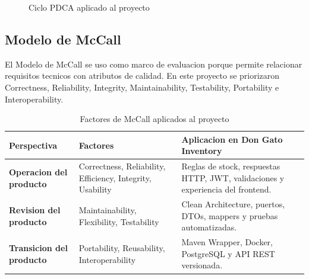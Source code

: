 \documentclass[11pt,oneside]{article}
\begin{document}
\begin{figure}[H]
\centering
{}
\caption{Ciclo PDCA aplicado al proyecto}
\end{figure}

\subsection{Modelo de McCall}

El Modelo de McCall se uso como marco de evaluacion porque permite relacionar requisitos tecnicos con atributos de calidad. En este proyecto se priorizaron Correctness, Reliability, Integrity, Maintainability, Testability, Portability e Interoperability.

\begin{table}[H]
\centering
\small
\caption{Factores de McCall aplicados al proyecto}
\begin{tabularx}{\textwidth}{>{\bfseries}p{}p{}Y}
\toprule
Perspectiva & Factores & Aplicacion en Don Gato Inventory\\
\midrule
Operacion del producto & Correctness, Reliability, Efficiency, Integrity, Usability & Reglas de stock, respuestas HTTP, JWT, validaciones y experiencia del frontend.\\
Revision del producto & Maintainability, Flexibility, Testability & Clean Architecture, puertos, DTOs, mappers y pruebas automatizadas.\\
Transicion del producto & Portability, Reusability, Interoperability & Maven Wrapper, Docker, PostgreSQL y API REST versionada.\\
\bottomrule
\end{tabularx}
\end{table}
\end{document}
